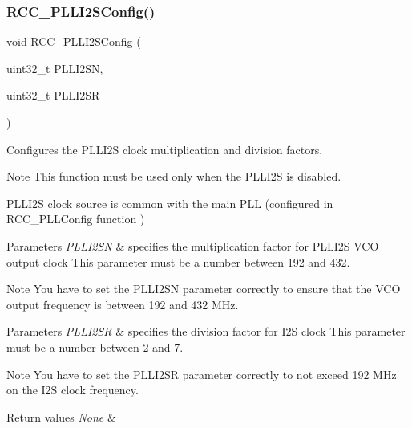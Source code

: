 \subsubsection{\texorpdfstring{R\+C\+C\+\_\+\+P\+L\+L\+I2\+S\+Config()}{RCC\_PLLI2SConfig()}}
{\footnotesize\ttfamily void R\+C\+C\+\_\+\+P\+L\+L\+I2\+S\+Config (\begin{DoxyParamCaption}\item[{uint32\+\_\+t}]{P\+L\+L\+I2\+SN,  }\item[{uint32\+\_\+t}]{P\+L\+L\+I2\+SR }\end{DoxyParamCaption})}



Configures the P\+L\+L\+I2S clock multiplication and division factors. 

\begin{DoxyNote}{Note}
This function must be used only when the P\+L\+L\+I2S is disabled. 

P\+L\+L\+I2S clock source is common with the main P\+LL (configured in R\+C\+C\+\_\+\+P\+L\+L\+Config function )
\end{DoxyNote}

\begin{DoxyParams}{Parameters}
{\em P\+L\+L\+I2\+SN} & specifies the multiplication factor for P\+L\+L\+I2S V\+CO output clock This parameter must be a number between 192 and 432. \\
\hline
\end{DoxyParams}
\begin{DoxyNote}{Note}
You have to set the P\+L\+L\+I2\+SN parameter correctly to ensure that the V\+CO output frequency is between 192 and 432 M\+Hz.
\end{DoxyNote}

\begin{DoxyParams}{Parameters}
{\em P\+L\+L\+I2\+SR} & specifies the division factor for I2S clock This parameter must be a number between 2 and 7. \\
\hline
\end{DoxyParams}
\begin{DoxyNote}{Note}
You have to set the P\+L\+L\+I2\+SR parameter correctly to not exceed 192 M\+Hz on the I2S clock frequency.
\end{DoxyNote}

\begin{DoxyRetVals}{Return values}
{\em None} & \\
\hline
\end{DoxyRetVals}


